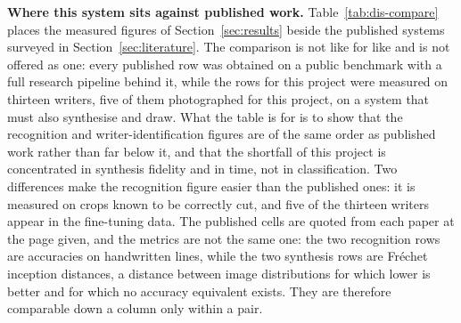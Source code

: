        \textbf{Where this system sits against published work.}
        Table~\ref{tab:dis-compare} places the measured figures of Section~\ref{sec:results} beside the published systems surveyed in Section~\ref{sec:literature}.
        The comparison is not like for like and is not offered as one: every published row was obtained on a public benchmark with a full research pipeline behind it, while the rows for this project were measured on thirteen writers, five of them photographed for this project, on a system that must also synthesise and draw.
        What the table is for is to show that the recognition and writer-identification figures are of the same order as published work rather than far below it, and that the shortfall of this project is concentrated in synthesis fidelity and in time, not in classification.
        Two differences make the recognition figure easier than the published ones: it is measured on crops known to be correctly cut, and five of the thirteen writers appear in the fine-tuning data.
        The published cells are quoted from each paper at the page given, and the metrics are not the same one: the two recognition rows are accuracies on handwritten lines, while the two synthesis rows are Fr\'echet inception distances, a distance between image distributions for which lower is better and for which no accuracy equivalent exists. They are therefore comparable down a column only within a pair. 

